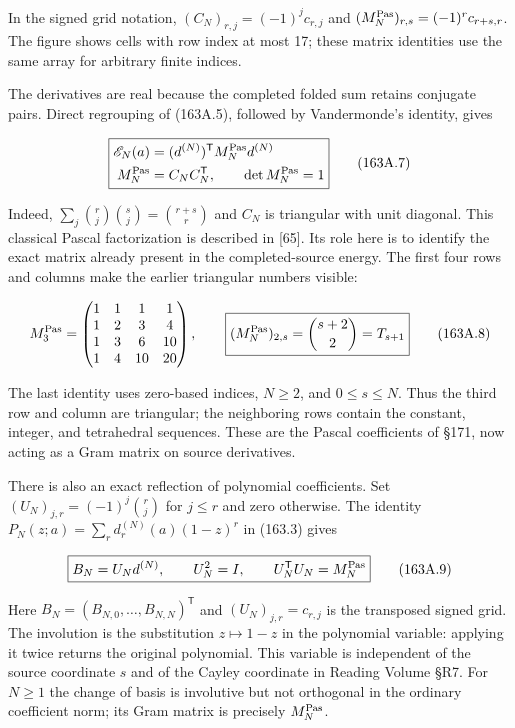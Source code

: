 \documentclass[
  11pt,
]{book}
\begin{document}
In the signed grid notation, \((C_N)_{r,j}=(-1)^j c_{r,j}\) and
\((M_N^{\rm Pas})_{r,s}=(-1)^r c_{r+s,r}\). The figure shows cells with
row index at most 17; these matrix identities use the same array for
arbitrary finite indices.

The derivatives are real because the completed folded sum retains
conjugate pairs. Direct regrouping of (163A.5), followed by
Vandermonde's identity, gives

\[
\boxed{\begin{aligned}
\mathscr E_N(a)&=(d^{(N)})^{\mathsf T}M_N^{\rm Pas}d^{(N)}\\
M_N^{\rm Pas}&=C_NC_N^{\mathsf T},\qquad
\det M_N^{\rm Pas}=1
\end{aligned}}
\tag{163A.7}
\]

Indeed, \(\sum_j\binom rj\binom sj=\binom{r+s}{r}\) and \(C_N\) is
triangular with unit diagonal. This classical Pascal factorization is
described in {[}65{]}. Its role here is to identify the exact matrix
already present in the completed-source energy. The first four rows and
columns make the earlier triangular numbers visible:

\[
M_3^{\rm Pas}=\begin{pmatrix}
1&1&1&1\\
1&2&3&4\\
1&3&6&10\\
1&4&10&20
\end{pmatrix},\qquad
\boxed{(M_N^{\rm Pas})_{2,s}
=\binom{s+2}{2}=T_{s+1}}
\tag{163A.8}
\]

The last identity uses zero-based indices, \(N\ge2\), and
\(0\le s\le N\). Thus the third row and column are triangular; the
neighboring rows contain the constant, integer, and tetrahedral
sequences. These are the Pascal coefficients of §171, now acting as a
Gram matrix on source derivatives.

There is also an exact reflection of polynomial coefficients. Set
\((U_N)_{j,r}=(-1)^j\binom rj\) for \(j\le r\) and zero otherwise. The
identity \(P_N(z;a)=\sum_r d_r^{(N)}(a)(1-z)^r\) in (163.3) gives

\[
\boxed{B_N=U_Nd^{(N)},\qquad U_N^2=I,\qquad
U_N^{\mathsf T}U_N=M_N^{\rm Pas}}
\tag{163A.9}
\]

Here \(B_N=(B_{N,0},\ldots,B_{N,N})^{\mathsf T}\) and
\((U_N)_{j,r}=c_{r,j}\) is the transposed signed grid. The involution is
the substitution \(z\mapsto1-z\) in the polynomial variable: applying it
twice returns the original polynomial. This variable is independent of
the source coordinate \(s\) and of the Cayley coordinate in Reading
Volume §R7. For \(N\ge1\) the change of basis is involutive but not
orthogonal in the ordinary coefficient norm; its Gram matrix is
precisely \(M_N^{\rm Pas}\).
\end{document}
